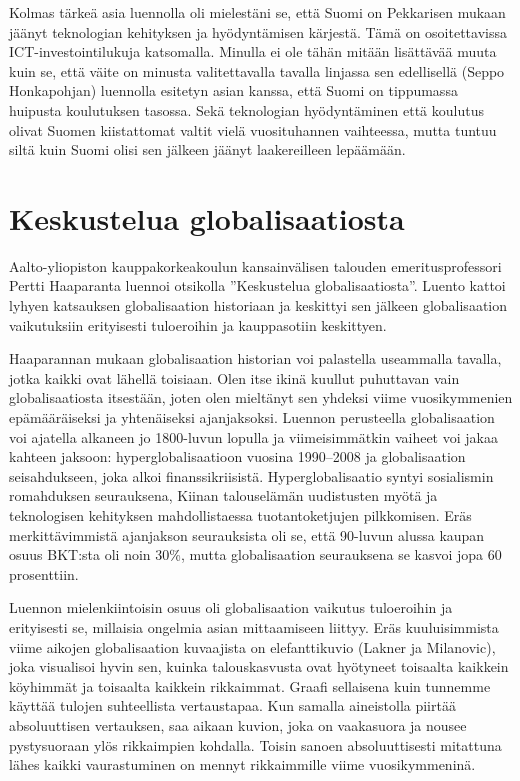\documentclass[12pt]{article}
\begin{document}
Kolmas tärkeä asia luennolla oli mielestäni se, että Suomi on Pekkarisen mukaan
jäänyt teknologian kehityksen ja hyödyntämisen kärjestä. Tämä on osoitettavissa
ICT-investointilukuja katsomalla. Minulla ei ole tähän mitään lisättävää muuta
kuin se, että väite on minusta valitettavalla tavalla linjassa sen edellisellä
(Seppo Honkapohjan) luennolla esitetyn asian kanssa, että Suomi on tippumassa
huipusta koulutuksen tasossa. Sekä teknologian hyödyntäminen että koulutus
olivat Suomen kiistattomat valtit vielä vuosituhannen vaihteessa, mutta tuntuu
siltä kuin Suomi olisi sen jälkeen jäänyt laakereilleen lepäämään.


\newpage
\section{Keskustelua globalisaatiosta}

Aalto-yliopiston kauppakorkeakoulun kansainvälisen talouden emeritusprofessori
Pertti Haaparanta luennoi otsikolla ''Keskustelua globalisaatiosta''. Luento
kattoi lyhyen katsauksen globalisaation historiaan ja keskittyi sen jälkeen
globalisaation vaikutuksiin erityisesti tuloeroihin ja kauppasotiin keskittyen.

Haaparannan mukaan globalisaation historian voi palastella useammalla tavalla,
jotka kaikki ovat lähellä toisiaan. Olen itse ikinä kuullut puhuttavan vain
globalisaatiosta itsestään, joten olen mieltänyt sen yhdeksi viime
vuosikymmenien epämääräiseksi ja yhtenäiseksi ajanjaksoksi. Luennon perusteella
globalisaation voi ajatella alkaneen jo 1800-luvun lopulla ja viimeisimmätkin
vaiheet voi jakaa kahteen jaksoon: hyperglobalisaatioon vuosina 1990--2008 ja
globalisaation seisahdukseen, joka alkoi finanssikriisistä. Hyperglobalisaatio
syntyi sosialismin romahduksen seurauksena, Kiinan talouselämän uudistusten
myötä ja teknologisen kehityksen mahdollistaessa tuotantoketjujen pilkkomisen.
Eräs merkittävimmistä ajanjakson seurauksista oli se, että 90-luvun alussa
kaupan osuus BKT:sta oli noin 30\%, mutta globalisaation seurauksena se kasvoi
jopa 60 prosenttiin.

Luennon mielenkiintoisin osuus oli globalisaation vaikutus tuloeroihin ja
erityisesti se, millaisia ongelmia asian mittaamiseen liittyy. Eräs
kuuluisimmista viime aikojen globalisaation kuvaajista on elefanttikuvio
(Lakner ja Milanovic), joka visualisoi hyvin sen, kuinka talouskasvusta ovat
hyötyneet toisaalta kaikkein köyhimmät ja toisaalta kaikkein rikkaimmat. Graafi
sellaisena kuin tunnemme käyttää tulojen suhteellista vertaustapaa. Kun samalla
aineistolla piirtää absoluuttisen vertauksen, saa aikaan kuvion, joka on
vaakasuora ja nousee pystysuoraan ylös rikkaimpien kohdalla. Toisin sanoen
absoluuttisesti mitattuna lähes kaikki vaurastuminen on mennyt rikkaimmille
viime vuosikymmeninä.
\end{document}

